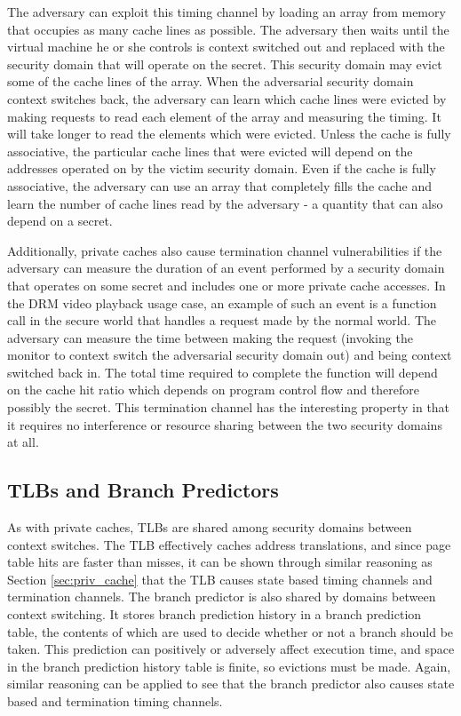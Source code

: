 The adversary can exploit this timing channel by loading an array from memory 
that occupies as many cache lines as possible. The adversary then waits until 
the virtual machine he or she controls is context switched out and replaced 
with the security domain that will operate on the secret. This security domain 
may evict some of the cache lines of the array. When the adversarial security 
domain context switches back, the adversary can learn which cache lines were 
evicted by making requests to read each element of the array and measuring the 
timing. It will take longer to read the elements which were evicted. Unless the 
cache is fully associative, the particular cache lines that were evicted will 
depend on the addresses operated on by the victim security domain. Even if the 
cache is fully associative, the adversary can use an array that completely 
fills the cache and learn the number of cache lines read by the adversary - a 
quantity that can also depend on a secret.

Additionally, private caches also cause termination channel vulnerabilities if 
the adversary can measure the duration of an event performed by a security 
domain that operates on some secret and includes one or more private cache
accesses. In the DRM video playback usage case, an example of such an event is 
a function call in the secure world that handles a request made by the normal 
world. The adversary can measure the time between making the request (invoking
the monitor to context switch the adversarial security domain out) and being 
context switched back in. The total time required to complete the function will 
depend on the cache hit ratio which depends on program control flow and 
therefore possibly the secret. This termination channel has the interesting 
property in that it requires no interference or resource sharing between the 
two security domains at all.
 
\subsection{TLBs and Branch Predictors}
As with private caches, TLBs are shared among security domains between context 
switches. The TLB effectively caches address translations, and since page table 
hits are faster than misses, it can be shown through similar reasoning as 
Section \ref{sec:priv_cache} that the TLB causes state based timing channels 
and termination channels. The branch predictor is also shared by domains 
between context switching. It stores branch prediction history in a branch 
prediction table, the contents of which are used to decide whether 
or not a branch should be taken. This prediction can positively or adversely 
affect execution time, and space in the branch prediction history table is 
finite, so evictions must be made. Again, similar reasoning can be applied to 
see that the branch predictor also causes state based and termination timing 
channels.

